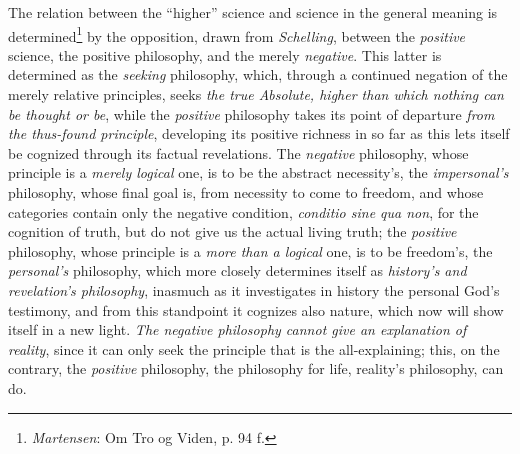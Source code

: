 \documentclass[12pt,a4paper]{book}
\begin{document}
The relation between the ``higher'' science and science in the general meaning is
determined\footnote{\emph{Martensen}: Om Tro og Viden, p. 94 f.} by the opposition, drawn from
\emph{Schelling}, between the \emph{positive} science, the positive philosophy, and the
merely \emph{negative}. This latter is determined as the \emph{seeking} philosophy, which, through
a continued negation of the merely relative principles, seeks \emph{the true Absolute,
higher than which nothing can be thought or be}, while the \emph{positive} philosophy takes its
point of departure \emph{from the thus-found principle}, developing its positive richness in
so far as this lets itself be cognized through its factual revelations. The \emph{negative}
philosophy, whose principle is a \emph{merely logical} one, is to be the abstract necessity's,
the \emph{impersonal's} philosophy, whose final goal is, from necessity to come to freedom, and
whose categories contain only the negative condition, \textit{conditio sine qua non}, for
the cognition of truth, but do not give us the actual living truth; the \emph{positive}
philosophy, whose principle is a \emph{more than a logical} one, is to be freedom's, the
\emph{personal's} philosophy, which more closely determines itself as \emph{history's and
revelation's philosophy}, inasmuch as it investigates in history the personal God's
testimony, and from this standpoint it cognizes also nature, which now will show itself in a
new light. \emph{The negative philosophy cannot give an explanation of reality}, since it can
only seek the principle that is the all-explaining; this, on the contrary, the \emph{positive}
philosophy, the philosophy for life, reality's philosophy, can do.
\end{document}
